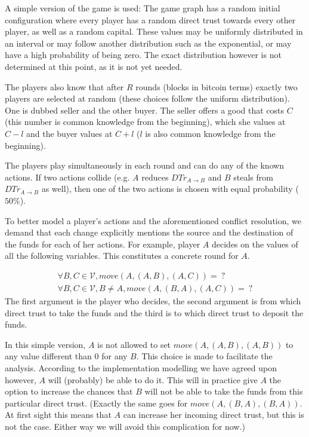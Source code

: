 A simple version of the game is used: The game graph has a random initial configuration where every player has a random direct
trust towards every other player, as well as a random capital. These values may be uniformly distributed in an interval or may
follow another distribution such as the exponential, or may have a high probability of being zero. The exact distribution
however is not determined at this point, as it is not yet needed.

The players also know that after $R$ rounds (blocks in bitcoin terms) exactly two players are selected at random (these
choices follow the uniform distribution). One is dubbed seller and the other buyer. The seller offers a good that costs $C$
(this number is common knowledge from the beginning), which she values at $C - l$ and the buyer values at $C + l$ ($l$ is also
common knowledge from the beginning).

The players play simultaneously in each round and can do any of the known actions. If two actions collide (e.g. $A$ reduces
$DTr_{A \rightarrow B}$ and $B$ steals from $DTr_{A \rightarrow B}$ as well), then one of the two actions is chosen with equal
probability ($50\%$).

To better model a player's actions and the aforementioned conflict resolution, we demand that each change explicitly mentions
the source and the destination of the funds for each of her actions. For example, player $A$ decides on the values of all the
following variables. This constitutes a concrete round for $A$.

\begin{gather*}
  \forall B, C \in \mathcal{V}, move\left(A, \left(A, B\right), \left(A, C\right) \right) = \: ? \\
  \forall B, C \in \mathcal{V}, B \neq A, move\left(A, \left(B, A\right), \left(A, C\right) \right) = \: ?
\end{gather*}
The first argument is the player who decides, the second argument is from which direct trust to take the funds and the third
is to which direct trust to deposit the funds.

In this simple version, $A$ is not allowed to set $move\left(A, \left(A, B\right), \left(A, B\right) \right)$ to any value
different than 0 for any $B$. This choice is made to facilitate the analysis. According to the implementation modelling we
have agreed upon however, $A$ will (probably) be able to do it. This will in practice give $A$ the option to increase
the chances that $B$ will not be able to take the funds from this particular direct trust. (Exactly the same goes for
$move\left(A, \left(B, A\right), \left(B, A\right) \right)$. At first sight this means that $A$ can increase her incoming
direct trust, but this is not the case. Either way we will avoid this complication for now.)

